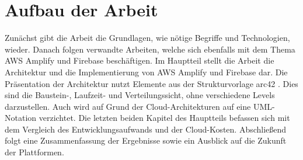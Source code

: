 \section{Aufbau der Arbeit}

Zunächst gibt die Arbeit die Grundlagen, wie nötige Begriffe und Technologien, wieder. Danach folgen verwandte Arbeiten, welche sich ebenfalls mit dem Thema \ac{AWS} Amplify und Firebase beschäftigen. Im Hauptteil stellt die Arbeit die Architektur und die Implementierung von \ac{AWS} Amplify und Firebase dar. Die Präsentation der Architektur nutzt Elemente aus der Strukturvorlage arc42 \autocite{starke2007strukturvorlage}. Dies sind die Baustein-, Laufzeit- und Verteilungssicht, ohne verschiedene Levels darzustellen. Auch wird auf Grund der Cloud-Architekturen auf eine UML-Notation verzichtet. Die letzten beiden Kapitel des Hauptteils befassen sich mit dem Vergleich des Entwicklungsaufwands und der Cloud-Kosten. Abschließend folgt eine Zusammenfassung der Ergebnisse sowie ein Ausblick auf die Zukunft der Plattformen.